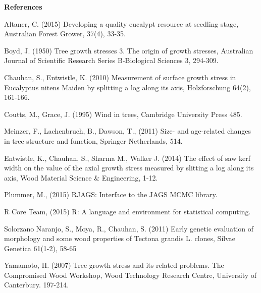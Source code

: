 \textbf{References}

Altaner, C. (2015) Developing a quality eucalypt resource at seedling stage, Australian Forest Grower, 37(4), 33-35. 

Boyd, J. (1950) Tree growth stresses 3. The origin of growth stresses, Australian Journal of Scientific Research Series B-Biological Sciences 3, 294-309.

Chauhan, S., Entwistle, K. (2010) Measurement of surface growth stress in Eucalyptus nitens Maiden by splitting a log along its axis, Holzforschung 64(2), 161-166.

Coutts, M., Grace, J. (1995) Wind in trees, Cambridge University Press 485. 

Meinzer, F., Lachenbruch, B., Dawson, T., (2011) Size- and age-related changes in tree structure and function, Springer Netherlands, 514.

Entwistle, K., Chauhan, S., Sharma M., Walker J. (2014) The effect of saw kerf width on the value of the axial growth stress measured by slitting a log along its axis, Wood Material Science \& Engineering, 1-12.

Plummer, M., (2015) RJAGS: Interface to the JAGS MCMC library. 

R Core Team, (2015) R: A language and environment for statistical computing.

Solorzano Naranjo, S., Moya, R., Chauhan, S. (2011) Early genetic evaluation of morphology and some wood properties of Tectona grandis L. clones, Silvae Genetica 61(1-2), 58-65

Yamamoto, H. (2007) Tree growth stress and its related problems. The Compromised Wood Workshop, Wood Technology Research Centre, University of Canterbury. 197-214.
